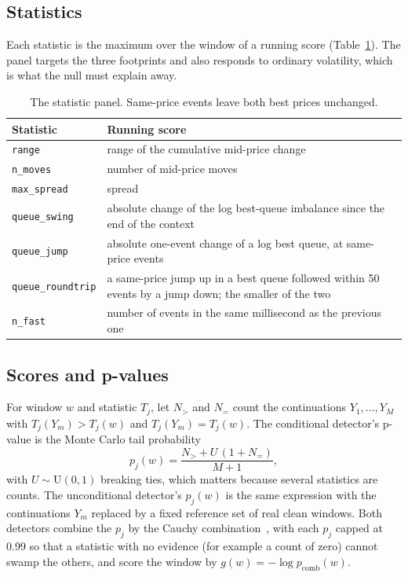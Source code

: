 \documentclass[journal]{IEEEtran}
\begin{document}
\subsection{Statistics}
Each statistic is the maximum over the window of a running score (Table~\ref{tab:stats}). The panel targets the
three footprints and also responds to ordinary volatility, which is what the null must explain away.

\begin{table}[t]
\centering
\caption{The statistic panel. Same-price events leave both best prices unchanged.}
\label{tab:stats}
\footnotesize
\begin{tabular}{@{}p{}p{}@{}}
\toprule
Statistic & Running score \\
\midrule
\texttt{range} & range of the cumulative mid-price change \\
\texttt{n\_moves} & number of mid-price moves \\
\texttt{max\_spread} & spread \\
\texttt{queue\_swing} & absolute change of the log best-queue imbalance since the end of the context \\
\texttt{queue\_jump} & absolute one-event change of a log best queue, at same-price events \\
\texttt{queue\_roundtrip} & a same-price jump up in a best queue followed within 50 events by a jump down; the
smaller of the two \\
\texttt{n\_fast} & number of events in the same millisecond as the previous one \\
\bottomrule
\end{tabular}
\end{table}

\subsection{Scores and p-values}
For window $w$ and statistic $T_j$, let $N_>$ and $N_=$ count the continuations $Y_1,\dots,Y_M$ with
$T_j(Y_m)>T_j(w)$ and $T_j(Y_m)=T_j(w)$. The conditional detector's p-value is the Monte Carlo tail probability
\begin{equation}
p_j(w)=\frac{N_>+U\,(1+N_=)}{M+1},
\end{equation}
with $U\sim\mathrm{U}(0,1)$ breaking ties, which matters because several statistics are counts. The
unconditional detector's $p_j(w)$ is the same expression with the continuations $Y_m$ replaced by a fixed
reference set of real clean windows. Both detectors combine the $p_j$ by the Cauchy
combination~\cite{liu2020cauchy}, with each $p_j$ capped at 0.99 so that a statistic with no evidence (for
example a count of zero) cannot swamp the others, and score the window by $g(w)=-\log p_{\mathrm{comb}}(w)$.
\end{document}
